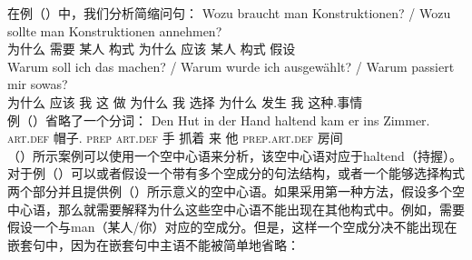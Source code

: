 \begin{exe}
\begin{xlist}[iv.]
\begin{exe}
\begin{xlist}[iv.]
\z
在例（）中，我们分析简缩问句：
\eal
\ex 
\gll Wozu braucht man Konstruktionen? / Wozu sollte man Konstruktionen annehmen?\\
     为什么 需要 某人 构式 {} 为什么 应该 某人 构式 假设\\
\ex 
\gll Warum soll ich das machen? / Warum wurde ich ausgewählt? / Warum passiert mir sowas?\\
	 为什么 应该 我 这 做 {} 为什么 \passivepst{} 我 选择 {} 为什么 发生 我 这种.事情\\
\zl
例（）省略了一个分词：
\ea
\gll Den Hut in der Hand haltend kam er ins Zimmer.\\
	 \textsc{art}.\textsc{def} 帽子.\acc{} \textsc{prep} \textsc{art}.\textsc{def} 手 抓着 来 他 \textsc{prep}.\textsc{art}.\textsc{def} 房间\\
\z
（）所示案例可以使用一个空中心语来分析，该空中心语对应于haltend（持握）。对于例（）可以或者假设一个带有多个空成分的句法结构，或者一个能够选择构式两个部分并且提供例（）所示意义的空中心语。如果采用第一种方法，假设多个空中心语，那么就需要解释为什么这些空中心语不能出现在其他构式中。例如，需要假设一个与man（某人/你）对应的空成分。但是，这样一个空成分决不能出现在嵌套句中，因为在嵌套句中主语不能被简单地省略：

\end{xlist}
\end{exe}
\end{xlist}
\end{exe}
